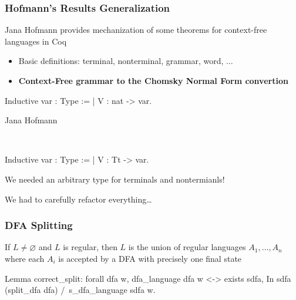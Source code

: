 \documentclass[xcolor=table]{beamer}
\begin{document}
\begin{frame}[fragile] \frametitle{Hofmann's Results Generalization}

Jana Hofmann provides mechanization of some theorems for context-free languages in Coq
\begin{itemize}
    \item Basic definitions: terminal, nonterminal, grammar, word, $\dots$
    \pause
    \item \textbf{Context-Free grammar to the Chomsky Normal Form convertion}
\end{itemize}
\pause

\begin{center}
  \begin{minipage}[t]{0.47\textwidth}
\begin{center}
    \begin{pyglist}[language=coq, numbers=none, numbersep=5pt]
    Inductive var : Type :=
     | V : nat -> var.
  	\end{pyglist}

    Jana Hofmann
  \end{center}
  \end{minipage}
  \pause
  ~ \vline \vline ~
  \begin{minipage}[t]{0.47\textwidth}
\begin{center}
    \begin{pyglist}[language=coq, numbers=none, numbersep=5pt]
    Inductive var : Type :=
     | V : Tt -> var.
    \end{pyglist}

    We needed an arbitrary type for terminals and nontermianls!
  \end{center}
  \end{minipage}

\pause
\vspace{0.5cm}
We had to carefully refactor everything\dots
\end{center}


\end{frame}


\begin{frame}[fragile] \frametitle{DFA Splitting}
If $ L \neq \varnothing $ and $L$ is regular, then $L$ is the union of regular languages $A_1, \ldots , A_n$ where each $A_i$ is accepted by a DFA with precisely one final state
\pause
\begin{pyglist}[language=coq, numbers=none, numbersep=5pt]
Lemma correct_split:
   forall dfa w,
     dfa_language dfa w <->
     exists sdfa,
        In sdfa (split_dfa dfa) /\ s_dfa_language sdfa w.
\end{pyglist}
\end{frame}
\end{document}
